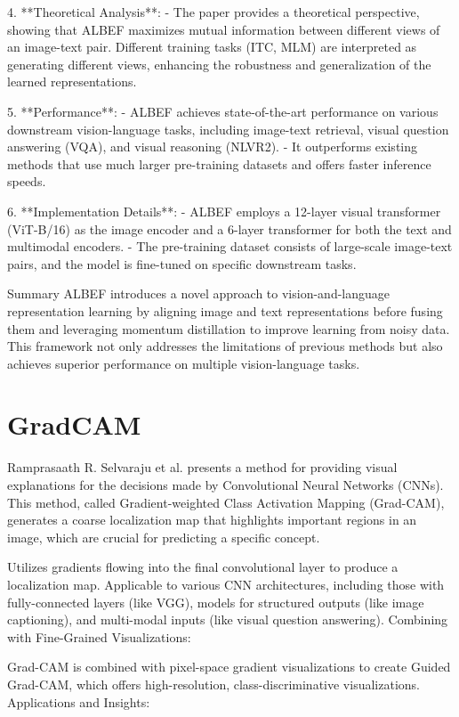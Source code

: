 4. **Theoretical Analysis**:
   - The paper provides a theoretical perspective, showing that ALBEF maximizes mutual information between different views of an image-text pair. Different training tasks (ITC, MLM) are interpreted as generating different views, enhancing the robustness and generalization of the learned representations.

5. **Performance**:
   - ALBEF achieves state-of-the-art performance on various downstream vision-language tasks, including image-text retrieval, visual question answering (VQA), and visual reasoning (NLVR2).
   - It outperforms existing methods that use much larger pre-training datasets and offers faster inference speeds.

6. **Implementation Details**:
   - ALBEF employs a 12-layer visual transformer (ViT-B/16) as the image encoder and a 6-layer transformer for both the text and multimodal encoders.
   - The pre-training dataset consists of large-scale image-text pairs, and the model is fine-tuned on specific downstream tasks.

 Summary
ALBEF introduces a novel approach to vision-and-language representation learning by aligning image and text representations before fusing them and leveraging momentum distillation to improve learning from noisy data. This framework not only addresses the limitations of previous methods but also achieves superior performance on multiple vision-language tasks.


\section{GradCAM}
Ramprasaath R. Selvaraju et al. presents a method for providing visual explanations for the decisions made by Convolutional Neural Networks (CNNs). This method, called Gradient-weighted Class Activation Mapping (Grad-CAM), generates a coarse localization map that highlights important regions in an image, which are crucial for predicting a specific concept.

Utilizes gradients flowing into the final convolutional layer to produce a localization map.
Applicable to various CNN architectures, including those with fully-connected layers (like VGG), models for structured outputs (like image captioning), and multi-modal inputs (like visual question answering).
Combining with Fine-Grained Visualizations:

Grad-CAM is combined with pixel-space gradient visualizations to create Guided Grad-CAM, which offers high-resolution, class-discriminative visualizations.
Applications and Insights:

